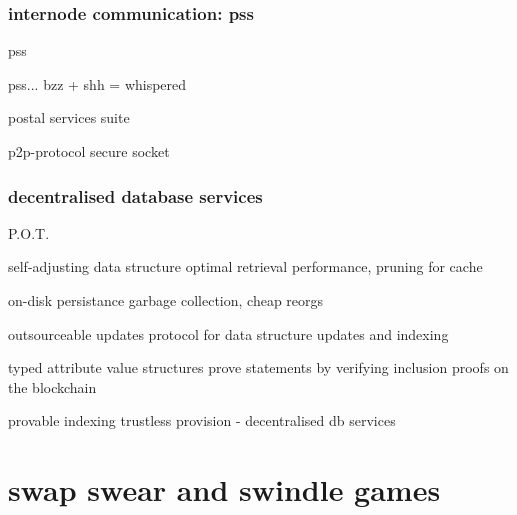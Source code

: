 \documentclass{beamer}
\begin{document}
\subsubsection{internode communication: pss}
\begin{frame}{pss}
\begin{block}{}
pss...  bzz + shh = whispered
\end{block}
\begin{block}{}
postal services suite
\end{block}
\begin{block}{}
p2p-protocol secure socket
\end{block}
\end{frame}
%
\subsubsection{decentralised database services}
%
\begin{frame}{P.O.T.}
\begin{block}{self-adjusting data structure}
  optimal retrieval performance, pruning for cache
\end{block}
\begin{block}{on-disk persistance}
  garbage collection, cheap reorgs
\end{block}
\begin{block}{outsourceable updates}
  protocol for data structure updates and indexing
\end{block}
\begin{block}{typed attribute value structures}
  prove statements by verifying inclusion proofs on the blockchain
\end{block}
\begin{block}{provable indexing}
  trustless provision - decentralised db services
\end{block}

\end{frame}
%

\section{swap swear and swindle games}
\end{document}
